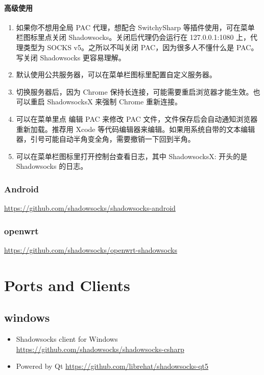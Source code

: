 \documentclass[11pt,a4paper]{sphinxmanual}
\begin{document}
\subsubsection{高级使用}
\label{sec-2-3-2-3}
\begin{enumerate}
\item 如果你不想用全局 PAC 代理，想配合 SwitchySharp 等插件使用，可在菜单栏图标里点关闭 Shadowsocks。关闭后代理仍会运行在 127.0.0.1:1080 上，代理类型为 SOCKS v5。之所以不叫关闭 PAC，因为很多人不懂什么是 PAC。写关闭 Shadowsocks 更容易理解。
\item 默认使用公共服务器，可以在菜单栏图标里配置自定义服务器。
\item 切换服务器后，因为 Chrome 保持长连接，可能需要重启浏览器才能生效。也可以重启 ShadowsocksX 来强制 Chrome 重新连接。
\item 可以在菜单里点 编辑 PAC 来修改 PAC 文件，文件保存后会自动通知浏览器重新加载。推荐用 Xcode 等代码编辑器来编辑。如果用系统自带的文本编辑器，引号可能自动半角变全角，需要撤销一下回到半角。
\item 可以在菜单栏图标里打开控制台查看日志，其中 ShadowsocksX: 开头的是 Shadowsocks 的日志。
\end{enumerate}

\subsection{Android}
\label{sec-2-3-3}
\href{https://github.com/shadowsocks/shadowsocks-android}{\url{https://github.com/shadowsocks/shadowsocks-android}}


\subsection{openwrt}
\label{sec-2-3-4}
\href{https://github.com/shadowsocks/openwrt-shadowsocks}{\url{https://github.com/shadowsocks/openwrt-shadowsocks}}




\chapter{Ports and Clients}
\label{sec-3}
\section{windows}
\label{sec-3-1}
\begin{itemize}
\item Shadowsocks client for Windows  \href{https://github.com/shadowsocks/shadowsocks-csharp}{\url{https://github.com/shadowsocks/shadowsocks-csharp}}
\item Powered by Qt   \href{https://github.com/librehat/shadowsocks-qt5}{\url{https://github.com/librehat/shadowsocks-qt5}}
\end{itemize}
\end{document}
